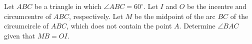 Let $ABC$ be a triangle in which $\angle ABC = 60^{\circ}$. Let $I$ and $O$ be the incentre and circumcentre of $ABC$,  respectively. Let $M$ be the midpoint of the arc $BC$ of the circumcircle of $ABC$,  which does not contain the point $A$. Determine $\angle BAC$ given that $MB = OI$.